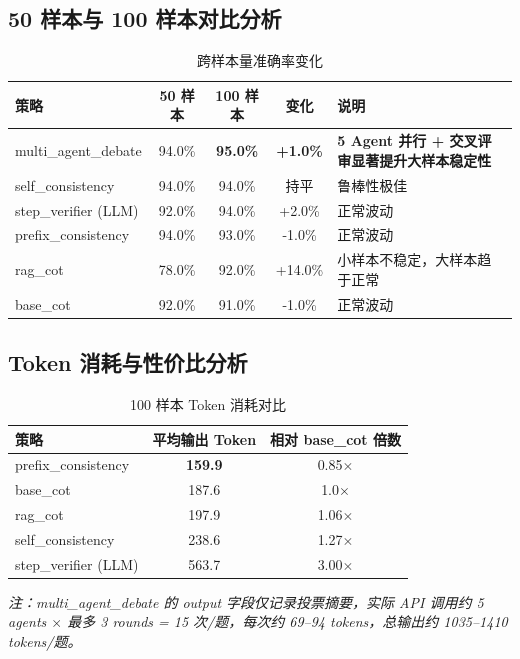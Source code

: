\documentclass[lang=cn,a4paper,newtx]{elegantpaper}
\begin{document}
\subsection{50 样本与 100 样本对比分析}

\begin{table}[htbp]
\centering
\caption{跨样本量准确率变化}
\begin{tabular}{lcccp{4cm}}
\toprule
策略 & 50 样本 & 100 样本 & 变化 & 说明 \\
\midrule
multi\_agent\_debate & 94.0\% & \textbf{95.0\%} & \textbf{+1.0\%} & \textbf{5 Agent 并行 + 交叉评审显著提升大样本稳定性} \\
self\_consistency & 94.0\% & 94.0\% & 持平 & 鲁棒性极佳 \\
step\_verifier (LLM) & 92.0\% & 94.0\% & +2.0\% & 正常波动 \\
prefix\_consistency & 94.0\% & 93.0\% & -1.0\% & 正常波动 \\
rag\_cot & 78.0\% & 92.0\% & +14.0\% & 小样本不稳定，大样本趋于正常 \\
base\_cot & 92.0\% & 91.0\% & -1.0\% & 正常波动 \\
\bottomrule
\end{tabular}
\end{table}

\subsection{Token 消耗与性价比分析}

\begin{table}[htbp]
\centering
\caption{100 样本 Token 消耗对比}
\begin{tabular}{lcc}
\toprule
策略 & 平均输出 Token & 相对 base\_cot 倍数 \\
\midrule
prefix\_consistency & \textbf{159.9} & 0.85$\times$ \\
base\_cot & 187.6 & 1.0$\times$ \\
rag\_cot & 197.9 & 1.06$\times$ \\
self\_consistency & 238.6 & 1.27$\times$ \\
step\_verifier (LLM) & 563.7 & 3.00$\times$ \\
\bottomrule
\end{tabular}
\end{table}

\textit{注：multi\_agent\_debate 的 output 字段仅记录投票摘要，实际 API 调用约 5 agents $\times$ 最多 3 rounds = 15 次/题，每次约 69--94 tokens，总输出约 1035--1410 tokens/题。}
\end{document}
